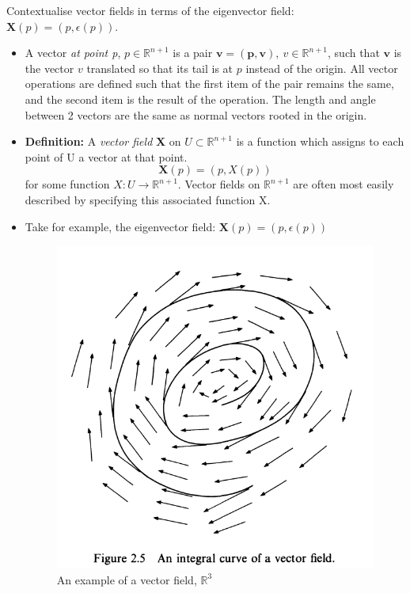 \documentclass[12pt]{report}
\begin{document}
Contextualise vector fields in terms of the eigenvector field: $\textbf{X}(p) = (p, \epsilon(p))$.

\begin{itemize}
    \item[] A vector \textit{at point p}, $p \in \mathbb{R}^{n+1}$ is a pair $\mathbf{v = (p, v)}, \ v \in \mathbb{R}^{n+1}$, such that $\mathbf{v}$ is the vector $v$ translated so that its tail is at $p$ instead of the origin. All vector operations are defined such that the first item of the pair remains the same, and the second item is the result of the operation. The length and angle between 2 vectors are the same as normal vectors rooted in the origin.
    \item[] \textbf{Definition:} A \textit{vector field} \textbf{X} on $U \subset \mathbb{R}^{n+1}$ is a function which assigns to each point
    of U a vector at that point. $$\textbf{X}(p) = (p, X(p))$$ for some function $X: U \longrightarrow \mathbb{R}^{n+1}$. Vector fields on $\mathbb{R}^{n+1}$ are often most easily described by specifying this associated function X.
    \item[] Take for example, the eigenvector field: $\textbf{X}(p) = (p, \epsilon(p))$ 
    \begin{figure}[h]
        \begin{center}
        	\includegraphics[scale=0.8]{fig2.5.PNG}
    		\caption{An example of a vector field, $\mathbb{R}^3$}
    		\label{fig:Graph 4}
        \end{center}
    \end{figure}
\end{itemize}
\newpage
\end{document}
